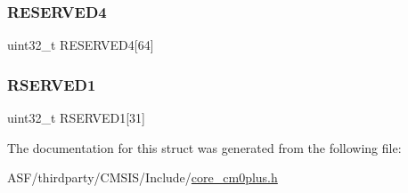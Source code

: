 \mbox{\label{struct_n_v_i_c___type_af900a5feb8eaad3787ff37801da4f949}} 
\subsubsection{\texorpdfstring{RESERVED4}{RESERVED4}}
{\footnotesize\ttfamily uint32\+\_\+t R\+E\+S\+E\+R\+V\+E\+D4\mbox{[}64\mbox{]}}

\mbox{\label{struct_n_v_i_c___type_ab8c47832d71ed57b001dbcc5741972e4}} 
\subsubsection{\texorpdfstring{RSERVED1}{RSERVED1}}
{\footnotesize\ttfamily uint32\+\_\+t R\+S\+E\+R\+V\+E\+D1\mbox{[}31\mbox{]}}



The documentation for this struct was generated from the following file\+:\begin{DoxyCompactItemize}
\item 
A\+S\+F/thirdparty/\+C\+M\+S\+I\+S/\+Include/\mbox{\hyperlink{core__cm0plus_8h}{core\+\_\+cm0plus.\+h}}\end{DoxyCompactItemize}
